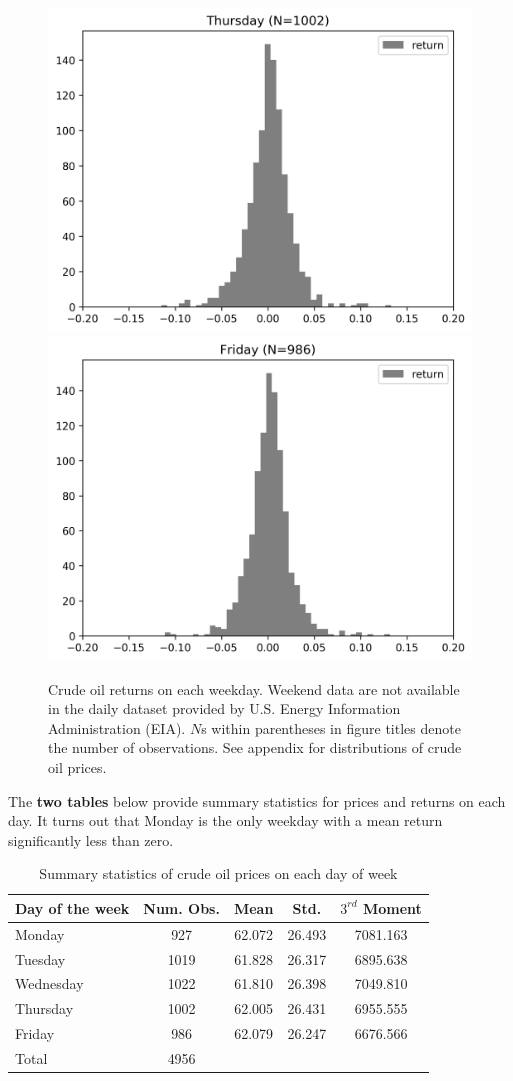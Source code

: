 \documentclass[12pt]{article}
\begin{document}
\begin{figure}[H]
		\includegraphics[width=0.45\linewidth]{figures/day_of_week_effect/dist_returns_Thursday.png}
		\includegraphics[width=0.45\linewidth]{figures/day_of_week_effect/dist_returns_Friday.png}
		\caption{Crude oil returns on each weekday. Weekend data are not available in the daily dataset provided by U.S. Energy Information Administration (EIA). $N$s within parentheses in figure titles denote the number of observations. See appendix for distributions of crude oil prices.}
	\end{figure}

	\par The \textbf{two tables} below provide summary statistics for prices and returns on each day. It turns out that Monday is the only weekday with a mean return significantly less than zero.
	\begin{table}[H]
		\small
		\centering
		\begin{tabular}{l|c c c c}
			\toprule
			Day of the week & Num. Obs. & Mean & Std. & $3^{rd}$ Moment \\
			\midrule
			Monday & 927 & 62.072 & 26.493 & 7081.163 \\
			Tuesday & 1019 & 61.828 & 26.317 & 6895.638 \\
			Wednesday & 1022 & 61.810 & 26.398 & 7049.810 \\
			Thursday & 1002 & 62.005 & 26.431 & 6955.555 \\
			Friday & 986 & 62.079 & 26.247 & 6676.566 \\
			\midrule
			Total & 4956 & & & \\
			\bottomrule
		\end{tabular}
		\caption{Summary statistics of crude oil prices on each day of week}
	\end{table}
\end{document}
